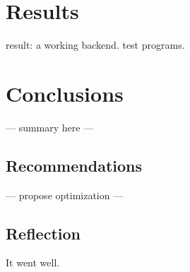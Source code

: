 \section{Results}
result: a working backend.
test programs.

\section{Conclusions}
--- summary here ---
\subsection{Recommendations}
--- propose optimization ---
\subsection{Reflection}
It went well.

